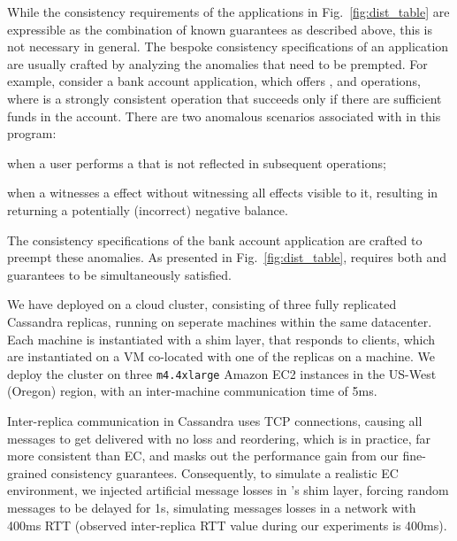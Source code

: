 %
While the consistency requirements of the applications in
Fig.~\ref{fig:dist_table} are expressible as the combination of known
guarantees as described above, this is not necessary in general. The
bespoke consistency specifications of an application are usually
crafted by analyzing the anomalies that need to be prempted.  For
example, consider a bank account application, which offers \dRV{},
\wdRV{} and \gbRV{} operations, where \wdRV{} is a strongly consistent
operation that succeeds only if there are sufficient funds in the
account. There are two anomalous scenarios associated with \gbRV{} in
this program: \begin{enumerate*}[label=(\roman*)] \item when a user
      performs a \dRV{} that is not reflected in subsequent \gbRV{}
    operations; \item when a \gbRV{} witnesses a \wdRV{} effect
without witnessing all \dRV{} effects visible to it,  resulting in
\gbRV{} returning a potentially (incorrect) negative balance.
\end{enumerate*} The consistency specifications of  the bank account
application are crafted to preempt these anomalies. As presented in
Fig.~\ref{fig:dist_table}, \gbRV{} requires both \rmwCTRT{} and
\visCTRT{} guarantees to be simultaneously satisfied.


We have deployed \tool on a cloud cluster,
consisting of three fully replicated Cassandra replicas, running on
seperate machines within the same
datacenter. 
Each machine is instantiated with a
\tool shim layer, that responds to clients,  
 which are instantiated on a VM 
co-located with one of the replicas on a machine.
We deploy the cluster on three \texttt{m4.4xlarge} Amazon EC2 instances
in the US-West (Oregon) region, with an inter-machine communication time of 5ms.

Inter-replica communication in Cassandra uses TCP connections, causing
all messages to get delivered with no loss and reordering, which is in
practice, far more consistent than EC, and masks out the performance
gain from our fine-grained consistency guarantees.  Consequently, to
simulate a realistic EC environment, we injected artificial message
losses in \tool's shim layer, forcing random messages to be delayed
for 1s, simulating messages losses in a network with 400ms RTT
(observed inter-replica RTT value during our experiments is 400ms).

